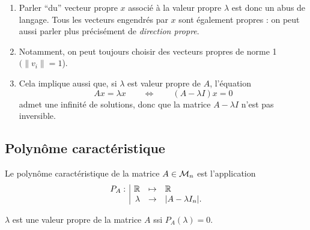\remarks
\begin{enumerate}
  \item Parler ``du'' vecteur propre $x$ associé à la valeur propre $\lambda$ est donc un abus de langage. Tous les vecteurs engendrés par $x$ sont également propres : on peut aussi parler plus précisément de {\em direction propre}. 
  \item Notamment, on peut toujours choisir des vecteurs propres de norme 1 $(\|v_i\| = 1$). 
  \item Cela implique aussi que, si $\lambda$ est valeur propre de $A$, l'équation
  \begin{equation} \label{eq:RqValeurPropre}
    Ax = \lambda x \qquad \Leftrightarrow \qquad (A - \lambda I)x = 0
  \end{equation}
  admet une infinité de solutions, donc que la matrice $A - \lambda I$ n'est pas inversible.
\end{enumerate}

\subsection{Polynôme caractéristique} \label{sec:polCarac}

\begin{definition}
  Le polynôme caractéristique de la matrice $A \in \mathcal{M}_n$ est l'application 
  $$
  \begin{array}{r|rcl}
   P_A: & \mathbb{R} & \mapsto & \mathbb{R} \\
    & \lambda & \to & |A - \lambda I_n|.
  \end{array}
  $$
\end{definition}

\bigskip
\begin{theorem}
  $\lambda$ est une valeur propre de la matrice $A$ ssi $P_A(\lambda) = 0$.
\end{theorem}

